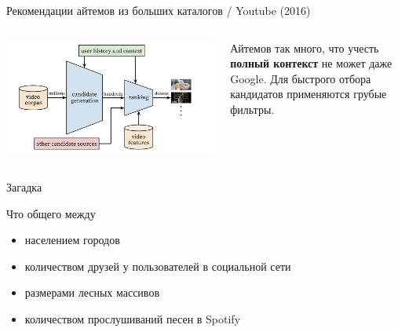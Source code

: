 \documentclass[11pt,aspectratio=169]{beamer}
\begin{document}
\begin{frame}{Рекомендации айтемов из больших каталогов / Youtube (2016) \cite{YTBE}}
\begin{columns}
\begin{column}{0.6\textwidth}
   \begin{center}
		\includegraphics[scale=0.25]{images/youtube.png}
   \end{center}
\end{column}
\begin{column}{0.35\textwidth}
   \begin{small}
    \begin{tcolorbox}[colback=info!5,colframe=info!80,title=]
    Айтемов так много, что учесть {\bf полный контекст} не может даже Google. Для быстрого отбора кандидатов применяются грубые фильтры.
    \end{tcolorbox}
    \end{small}
\end{column}
\end{columns}

\end{frame}

\begin{frame}{Загадка}

Что общего между
\begin{itemize}
\item населением городов
\item количеством друзей у пользователей в социальной сети
\item размерами лесных массивов
\item количеством прослушиваний песен в Spotify
\end{itemize}

\end{frame}
\end{document}
